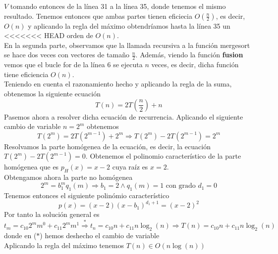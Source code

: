 \documentclass[11pt,openany]{book}
\begin{document}
$V$ tomando entonces de la línea 31 a la línea 35, donde tenemos el mismo resultado. Tenemos entonces que ambas partes
tienen eficiecia $O(\frac{n}{2})$, es decir, $O(n)$ y aplicando la regla del máximo obtendríamos hasta la línea 35 un
<<<<<<< HEAD
orden de $O(n)$. \\
En la segunda parte, observamos que la llamada recursiva a la función mergesort se hace dos veces con vectores de tamaño $\frac{n}{2}$.
Además, viendo la función \textbf{fusion} vemos que el bucle for de la línea 6 se ejecuta $n$ veces, es decir, dicha función
tiene eficiencia $O(n)$. \\
Teniendo en cuenta el razonamiento hecho y aplicando la regla de la suma, obtenemos la siguiente ecuación
\begin{equation*}
    T(n)=2T(\frac{n}{2})+n
\end{equation*}
Pasemos ahora a resolver dicha ecuación de recurrencia. Aplicando el siguiente cambio de variable $n=2^m$ obtenemos
\begin{equation*}
    T(2^m)=2T(2^{m-1})+2^m \Longrightarrow T(2^m)-2T(2^{m-1})=2^m
\end{equation*}
Resolvamos la parte homógenea de la ecuación, es decir, la ecuación $T(2^m)-2T(2^{m-1})=0$. Obtenemos el polinomio
característico de la parte homógenea que es $p_H(x)=x-2$ cuya raíz es $x=2$. \\
Obtengamos ahora la parte no homógenea
\begin{equation*}
    2^m=b_1^m q_1(m) \Longrightarrow b_1=2 \wedge q_1(m)=1 \text{ con grado } d_1=0
\end{equation*}
Tenemos entonces el siguiente polinómio característico
\begin{equation*}
    p(x)=(x-2)(x-b_1)^{d_1+1}=(x-2)^2
\end{equation*}
Por tanto la solución general es
\begin{equation*}
    t_m=c_{10}2^mm^0+c_{11}2^mm^1  \overset{*}{\Longrightarrow}  t_n=c_{10}n+c_{11}n\log_2(n) \Longrightarrow T(n)=c_{10}n+c_{11}n\log_2(n)
\end{equation*}
donde en ($*$) hemos deshecho el cambio de variable \\
Aplicando la regla del máximo tenemos $T(n) \in O(n\log(n))$
\end{document}
